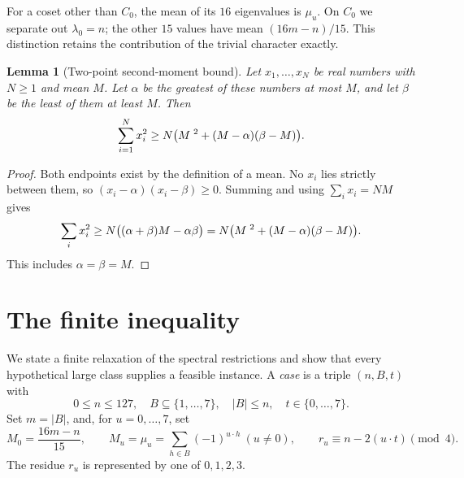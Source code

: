 \documentclass[11pt]{article}
\newtheorem{lemma}[theorem]{Lemma}
\theoremstyle{definition}
\begin{document}
For a coset other than $C_0$, the mean of its $16$ eigenvalues is
$\mu_u$. On $C_0$ we separate out $\lambda_0=n$; the other $15$
values have mean $(16m-n)/15$. This distinction retains the contribution
of the trivial character exactly.

\begin{lemma}[Two-point second-moment bound]\label{lem:two}
Let $x_1,\ldots,x_N$ be real numbers with $N\geq1$ and mean $M$.
Let $\alpha$ be the greatest of these numbers at most $M$, and let
$\beta$ be the least of them at least $M$. Then
\begin{equation}\label{eq:twopoint}
 \sum_{i=1}^N x_i^2\geq
       N\bigl(M^{\mkern6mu 2}+(M-\alpha)(\beta-M)\bigr).
\end{equation}
\end{lemma}
\begin{proof}
Both endpoints exist by the definition of a mean. No $x_i$ lies strictly
between them, so $(x_i-\alpha)(x_i-\beta)\geq0$.
Summing and using $\sum_i x_i=NM$ gives
\[
 \sum_i x_i^2\geq N\bigl((\alpha+\beta)M-\alpha\beta\bigr)
 =N\bigl(M^{\mkern6mu 2}+(M-\alpha)(\beta-M)\bigr).
\]
This includes $\alpha=\beta=M$.
\end{proof}

\section{The finite inequality}\label{sec:finite}
We state a finite relaxation of the spectral restrictions and show that
every hypothetical large class supplies a feasible instance.
A \emph{case} is a triple $(n,B,t)$ with
\begin{equation}\label{eq:case}
 0\leq n\leq127,\quad B\subseteq\{1,\ldots,7\},\quad
 |B|\leq n,\quad t\in\{0,\ldots,7\}.
\end{equation}
Set $m=|B|$, and, for $u=0,\ldots,7$, set
\begin{equation}\label{eq:means}
 M_0=\frac{16m-n}{15},\qquad
 M_u=\mu_u=\sum_{h\in B}(-1)^{u\cdot h}\ (u\ne0),\qquad
 r_u\equiv n-2(u\cdot t)\pmod4.
\end{equation}
The residue $r_u$ is represented by one of $0,1,2,3$.
\end{document}

